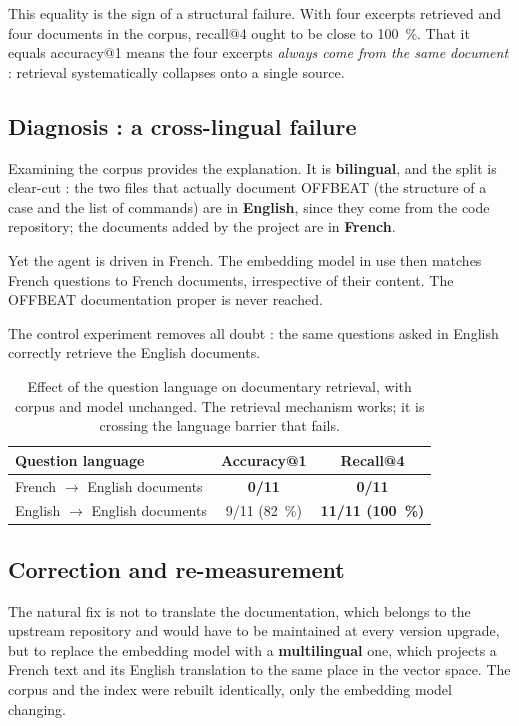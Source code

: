 This equality is the sign of a structural failure. With four excerpts retrieved
and four documents in the corpus, recall@4 ought to be close to
\SI{100}{\percent}. That it equals accuracy@1 means the four excerpts
\emph{always come from the same document} : retrieval systematically collapses
onto a single source.

\subsection{Diagnosis : a cross-lingual failure}

Examining the corpus provides the explanation. It is \textbf{bilingual}, and the
split is clear-cut : the two files that actually document OFFBEAT (the structure
of a case and the list of commands) are in \textbf{English}, since they come
from the code repository; the documents added by the project are in
\textbf{French}.

Yet the agent is driven in French. The embedding model in use then matches
French questions to French documents, irrespective of their content. The OFFBEAT
documentation proper is never reached.

The control experiment removes all doubt : the same questions asked in English
correctly retrieve the English documents.

\begin{table}[htbp]
\centering
\caption[Effect of language on retrieval]{Effect of the question language on
documentary retrieval, with corpus and model unchanged. The retrieval mechanism
works; it is crossing the language barrier that fails.}
\label{tab:rag-langue}
\begin{tabularx}{0.92\textwidth}{@{}Xcc@{}}
\toprule
\textbf{Question language} & \textbf{Accuracy@1} & \textbf{Recall@4}\\
\midrule
French $\rightarrow$ English documents & \textcolor{cAlert}{\textbf{0/11}} &
  \textcolor{cAlert}{\textbf{0/11}}\\
English $\rightarrow$ English documents & 9/11 (\SI{82}{\percent}) &
  \textbf{11/11 (\SI{100}{\percent})}\\
\bottomrule
\end{tabularx}
\end{table}

\subsection{Correction and re-measurement}

The natural fix is not to translate the documentation, which belongs to the
upstream repository and would have to be maintained at every version upgrade,
but to replace the embedding model with a \textbf{multilingual} one, which
projects a French text and its English translation to the same place in the
vector space. The corpus and the index were rebuilt identically, only the
embedding model changing.

